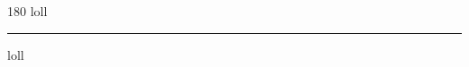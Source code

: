 
\begin{frame}
\begin{center}
\begin{turn}{180}
{\fontsize{2.5cm}{1em}\selectfont loll}
\end{turn}
\vspace{1em}\par  
\hrule
\vspace{1em}\par  
{\fontsize{2.5cm}{1em}\selectfont loll}
\end{center}
\end{frame}
